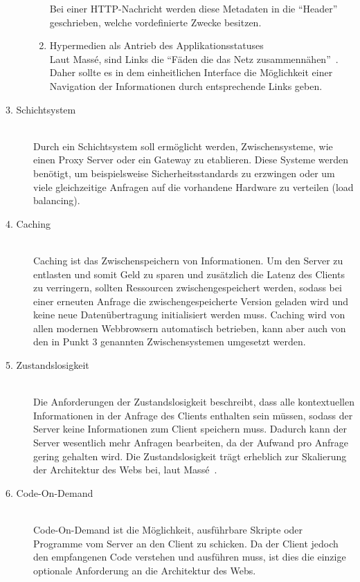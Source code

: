 \begin{description}
\begin{enumerate}
        Bei einer \gls{HTTP}-Nachricht werden diese Metadaten in die ``Header'' 
        geschrieben, welche vordefinierte Zwecke besitzen.

        \item Hypermedien als Antrieb des Applikationsstatuses\hfill \\
        Laut Massé, sind Links die ``Fäden die das Netz zusammennähen''~\cite[][4]{Mas11}.
        Daher sollte es in dem einheitlichen Interface die Möglichkeit einer Navigation
        der Informationen durch entsprechende Links geben.

    \end{enumerate}

    \item[3. Schichtsystem]\hfill \\
    Durch ein Schichtsystem soll ermöglicht werden, Zwischensysteme, wie einen
    Proxy Server oder ein Gateway zu etablieren. Diese Systeme werden benötigt, 
    um beispielsweise Sicherheitsstandards zu erzwingen oder um viele gleichzeitige
    Anfragen auf die vorhandene Hardware zu verteilen (load balancing).

    \item[4. Caching]\hfill \\
    Caching ist das Zwischenspeichern von Informationen. Um den Server zu entlasten
    und somit Geld zu sparen und zusätzlich die Latenz des Clients zu verringern,
    sollten Ressourcen zwischengespeichert werden, sodass bei einer erneuten 
    Anfrage die zwischengespeicherte Version geladen wird und keine neue 
    Datenübertragung initialisiert werden muss. Caching wird von allen modernen 
    Webbrowsern automatisch betrieben, kann aber auch von den in Punkt 3 genannten
    Zwischensystemen umgesetzt werden.

    \newpage
    \item[5. Zustandslosigkeit]\hfill \\
    Die Anforderungen der Zustandslosigkeit beschreibt, dass alle kontextuellen 
    Informationen in der Anfrage des Clients enthalten sein müssen, sodass der 
    Server keine Informationen zum Client speichern muss. Dadurch kann der Server
    wesentlich mehr Anfragen bearbeiten, da der Aufwand pro Anfrage gering 
    gehalten wird. Die Zustandslosigkeit trägt erheblich zur Skalierung der
    Architektur des Webs bei, laut Massé~\cite[][4]{Mas11}. 

    \item[6. Code-On-Demand]\hfill \\
    Code-On-Demand ist die Möglichkeit, ausführbare Skripte oder Programme vom 
    Server an den Client zu schicken. Da der Client jedoch den empfangenen Code
    verstehen und ausführen muss, ist dies die einzige optionale Anforderung an
    die Architektur des Webs.
\end{description}

